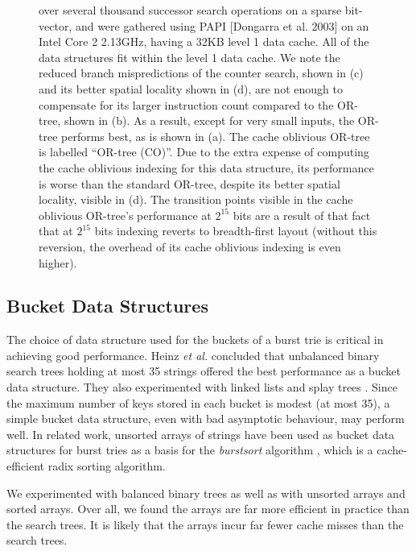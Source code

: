\documentclass[]{acmtrans2m}
\begin{document}
\begin{figure}
{over several thousand successor search operations on a sparse bit-vector, and were gathered using PAPI [Dongarra et al. 2003] on an Intel Core 2
2.13GHz, having a 32KB level 1 data cache. All of the data structures fit within the level 1 data cache. We note the reduced branch mispredictions
of the counter search, shown in (c) and its better spatial locality shown in (d), are not enough to compensate for its larger instruction count
compared to the OR-tree, shown in (b). As a result, except for very small inputs, the OR-tree performs best, as is shown in (a). 
The cache oblivious OR-tree is labelled ``OR-tree (CO)''. Due to the extra expense of computing the cache oblivious
indexing for this data structure, its performance is worse than the standard OR-tree, despite its better spatial locality, visible in (d). 
The transition points visible in the cache oblivious OR-tree's 
performance at $2^{15}$ bits are a result of that fact that at $2^{15}$ bits indexing reverts to breadth-first layout (without this reversion,
the overhead of its cache oblivious indexing is even higher).}
\label{node_structs_plots}
\end{figure}


\subsection{Bucket Data Structures}
\label{bucket_structs}

The choice of data structure used for the buckets of a burst trie is critical in achieving
good performance. Heinz \textit{et al.} \cite{Heinz+02} concluded that unbalanced binary
search trees holding at most 35 strings offered the best performance as a bucket
data structure. They also experimented with linked lists and splay trees \cite{SleatorTarjan85}.
Since the maximum number of keys stored in each bucket is modest (at most 35), a simple
bucket data structure, even with bad asymptotic behaviour, may perform well. 
In related work, unsorted arrays of strings
have been used as bucket data structures for burst tries as a basis for the \textit{burstsort}
algorithm \cite{SinhaWirth08,Sinha+06,SinhaZobel05,SinhaZobel04,Sinha04}, which is a cache-efficient radix sorting algorithm.

We experimented with balanced binary trees as well as with unsorted arrays and sorted arrays.
Over all, we found the arrays are far more efficient in practice than the search trees. 
It is likely that the arrays incur far fewer cache misses than the search trees. 
\end{document}
